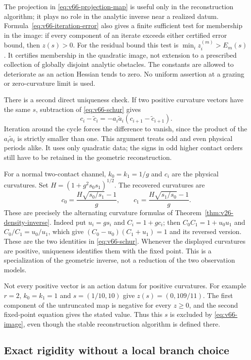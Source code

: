 The projection in \eqref{eq:v66-projection-map} is useful only in the
reconstruction algorithm; it plays no role in the analytic inverse near
a realized datum.  Formula~\eqref{eq:v66-iteration-error} also gives a
finite sufficient test for membership in the image: if every component
of an iterate exceeds either certified error bound, then $z(s)>0$.
For the residual bound this test is $\min_i z_i^{(m)}>E_m(s)$.
It certifies membership in the quadratic image, not extension to a
prescribed collection of globally disjoint analytic obstacles.
The constants are allowed to deteriorate as an action Hessian tends to
zero.  No uniform assertion at a grazing or zero-curvature limit is used.

There is a second direct uniqueness check.  If two positive curvature
vectors have the same $s$, subtraction of \eqref{eq:v66-schur} gives
\[
 c_i-\widetilde c_i
       =-a_i\widetilde a_i(c_{i+1}-\widetilde c_{i+1}).
\]
Iteration around the cycle forces the difference to vanish, since the
product of the $a_i\widetilde a_i$ is strictly smaller than one.
This argument treats odd and even physical periods alike.  It uses only
quadratic data; the signs in odd higher contact orders still have to be
retained in the geometric reconstruction.

For a normal two-contact channel, $k_0=k_1=1/g$ and $c_i$ are the
physical curvatures.  Set $H=(1+g^2s_0s_1)^{1/2}$.  The recovered
curvatures are
\[
 c_0=\frac{H\sqrt{s_0/s_1}-1}{g},\qquad
 c_1=\frac{H\sqrt{s_1/s_0}-1}{g}.
\]
These are precisely the alternating curvature formulas of
Theorem~\ref{thm:v26-density-inverse}.  Indeed put
$u_i=gs_i$ and $C_i=1+gc_i$; then $C_0C_1=1+u_0u_1$ and
$C_0/C_1=u_0/u_1$, which give
$(C_0-u_0)(C_1+u_1)=1$ and its reversed version.
These are the two identities in \eqref{eq:v66-schur}.
Whenever the displayed curvatures are positive, uniqueness identifies
them with the fixed point.  This is a specialization of the geometric
inverse, not a reduction of the two observation models.

Not every positive vector is an action datum for positive curvatures.
For example $r=2$, $k_0=k_1=1$ and $s=(1/10,10)$ give
$z(s)=(0,109/11)$.  The first component of the untruncated map is
negative for every $z\ge0$, and the second fixed-point equation gives
the stated value.  Thus this $s$ is excluded by \eqref{eq:v66-image},
even though the stable reconstruction algorithm is defined there.

\subsection{Exact rigidity without a local branch choice}


